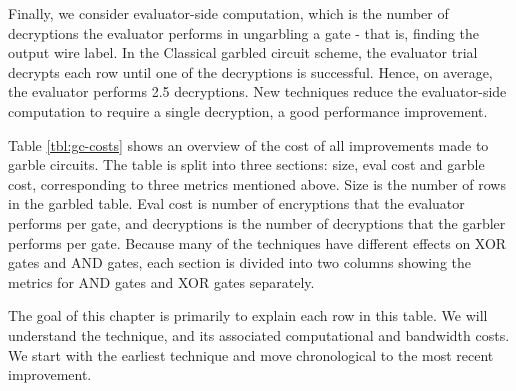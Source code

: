 Finally, we consider evaluator-side computation, which is the number of decryptions the evaluator performs in ungarbling a gate - that is, finding the output wire label.
In the Classical garbled circuit scheme, the evaluator trial decrypts each row until one of the decryptions is successful.
Hence, on average, the evaluator performs 2.5 decryptions.
New techniques reduce the evaluator-side computation to require a single decryption, a good performance improvement.

Table \ref{tbl:gc-costs} shows an overview of the cost of all improvements made to garble circuits.
The table is split into three sections: size, eval cost and garble cost, corresponding to three metrics mentioned above.
Size is the number of rows in the garbled table.
Eval cost is number of encryptions that the evaluator performs per gate, and decryptions is the number of decryptions that the garbler performs per gate.
Because many of the techniques have different effects on XOR gates and AND gates, each section is divided into two columns showing the metrics for AND gates and XOR gates separately.

The goal of this chapter is primarily to explain each row in this table.
We will understand the technique, and its associated computational and bandwidth costs.
We start with the earliest technique and move chronological to the most recent improvement.

